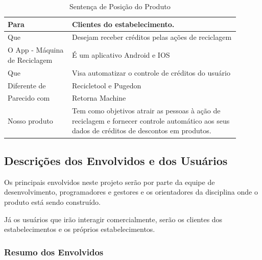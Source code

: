 \begin{apendicesenv}
\begin{table}[htp]
    \centering
    \caption{Sentença de Posição do Produto}
    \label{my-label}
    \begin{tabular}{|p{0.25\linewidth}|p{0.65\linewidth}|}
        \hline
        Para              & Clientes do estabelecimento. \\ \hline
        Que               & Desejam receber créditos pelas ações de reciclagem  \\ \hline
        O App - Máquina de Reciclagem    & É um aplicativo Android e IOS \\ \hline
        Que & Visa automatizar o controle de créditos do usuário  \\ \hline
        Diferente de & Recicletool \cite{recicletool} e Pugedon \cite{pugedon}  \\ \hline
        Parecido com & Retorna Machine \cite{retornaMachine} \\ \hline
        Nosso produto & Tem como objetivos atrair as pessoas à ação de reciclagem e fornecer controle automático aos seus dados de créditos de descontos em produtos. \\ \hline
    \end{tabular}
\end{table}

\subsection{Descrições dos Envolvidos e dos Usuários}
Os principais envolvidos neste projeto serão por parte da equipe de desenvolvimento, programadores e gestores e os orientadores da disciplina onde o produto está sendo construído.

Já os usuários que irão interagir comercialmente, serão os clientes dos estabelecimentos e os próprios estabelecimentos.

\subsubsection{Resumo dos Envolvidos}


\end{apendicesenv}
